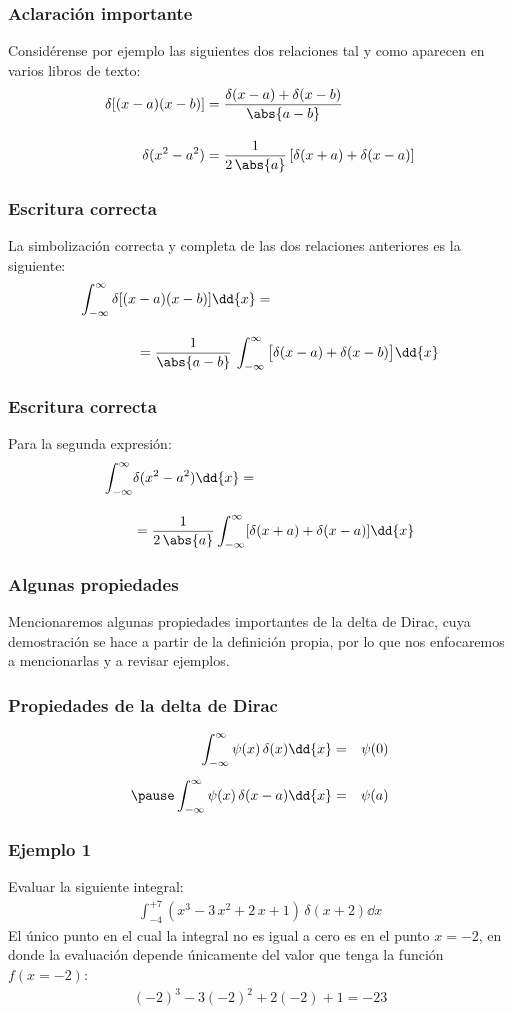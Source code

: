 \begin{frame}
\frametitle{Aclaración importante}
Considérense por ejemplo las siguientes dos relaciones tal y como aparecen en varios libros de texto:
\begin{align*}
\delta [ (x - a)(x - b)] &= \dfrac{\delta (x - a) + \delta(x - b)}{\abs{a - b}} \\[1em]
\delta (x^{2} - a^{2}) &= \dfrac{1}{2 \, \abs{a}} \, [\delta (x + a) + \delta(x - a)]
\end{align*}
\end{frame}
\begin{frame}
\frametitle{Escritura correcta}
La simbolización correcta y completa de las dos relaciones anteriores es la siguiente:
\begin{align*}
\int_{-\infty}^{\infty} \delta [ (x &- a)(x - b)] \dd{x} = \\[1em]
&= \dfrac{1}{\abs{a - b}} \, \int_{-\infty}^{\infty} \big[ \delta (x - a) + \delta(x - b) \big] \dd{x}
\end{align*}
\end{frame}
\begin{frame}
\frametitle{Escritura correcta}
Para la segunda expresión:
\begin{align*}
\int_{-\infty}^{\infty} &\delta (x^{2} - a^{2})\dd{x} = \\[1em]
&= \dfrac{1}{2 \, \abs{a}} \int_{-\infty}^{\infty} [\delta (x + a) + \delta(x - a)] \dd{x}
\end{align*}
\end{frame}
\begin{frame}
\frametitle{Algunas propiedades}
Mencionaremos algunas propiedades importantes de la delta de Dirac, cuya demostración se hace a partir de la definición propia, por lo que nos enfocaremos a mencionarlas y a revisar ejemplos.
\end{frame}
\begin{frame}
\frametitle{Propiedades de la delta de Dirac}
\begin{eqnarray*}
\int_{-\infty}^{\infty} \psi (x) \, \delta (x) \dd{x} &=& \psi(0) \\[0.5em] \pause
\int_{-\infty}^{\infty} \psi (x) \, \delta (x - a) \dd{x} &=& \psi(a)
\end{eqnarray*}
\end{frame}
\begin{frame}
\frametitle{Ejemplo 1}
Evaluar la siguiente integral:
\begin{align*}
\int_{-4}^{+7} (x^{3} - 3 \, x^{2} + 2 \, x + 1) \, \delta(x + 2) \dd{x}
\end{align*}
\pause
El único punto en el cual la integral no es igual a cero es en el punto $x = -2$, en donde la evaluación depende únicamente del valor que tenga la función $f(x = -2)$:
\begin{align*}
(-2)^{3} - 3 (-2)^{2} + 2(-2) + 1 = -23
\end{align*}
\end{frame}
